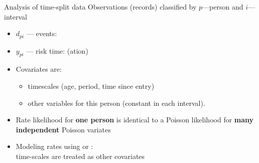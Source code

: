 \begin{frame}[fragile]{Analysis of time-split data}
Observations (records) classified by $p$---person and $i$---interval
\begin{itemize}[<+->]
\item $d_{pi}$ --- events: 
\item $y_{pi}$ --- risk time:  (ation)\\
\item Covariates are:

\begin{itemize}
\item timescales (age, period, time since entry)
\item other variables for this person (constant in each interval).
\end{itemize}

\item Rate likelihood for \textbf{one person} is identical to a Poisson
  likelihood for \textbf{many independent} Poisson variates
\item Modeling rates using  or :\\
  time-scales are treated as other covariates
\end{itemize}
\end{frame}


